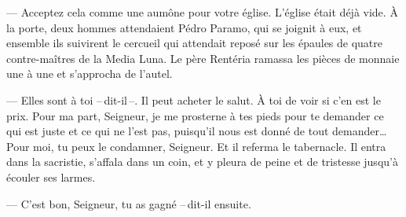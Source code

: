   --- Acceptez cela comme une aumône pour votre église.
\pend
%
\pstart
  L'église était déjà vide. À la porte, deux hommes attendaient Pédro Paramo, qui se joignit à eux, et ensemble ils suivirent le cercueil qui attendait reposé sur les épaules de quatre contre-maîtres de la Media Luna.
\pend
%
\pstart
  Le père Rentéria ramassa les pièces de monnaie une à une et s'approcha de l'autel.

  --- Elles sont à toi --\,dit-il\,--. Il peut acheter le salut. À toi de voir si c'en est le prix. Pour ma part, Seigneur, je me prosterne à tes pieds pour te demander ce qui est juste et ce qui ne l'est pas, puisqu'il nous est donné de tout demander\ldots Pour moi, tu peux le condamner, Seigneur.
\pend
%
\pstart
  Et il referma le tabernacle.
\pend
%
\pstart
  Il entra dans la sacristie, s'affala dans un coin, et y pleura de peine et de tristesse jusqu'à écouler ses larmes.

  --- C'est bon, Seigneur, tu as gagné --\,dit-il ensuite.
\pend
